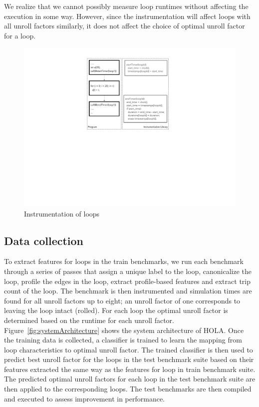 \documentclass[]{sig-alternate}
\begin{document}
We realize that we cannot possibly measure loop runtimes without affecting the execution in some way. However, since the instrumentation will affect loops with all unroll factors similarly, it does not affect the choice of optimal unroll factor for a loop. 

\begin{figure}
  \center
  \includegraphics[width=0.90\linewidth]{fig/instrumentation.pdf}
  \caption{Instrumentation of loops}
  \label{fig:instrumentation}
\end{figure}

\subsection{Data collection}
\label{subsec:DataCollection}

To extract features for loops in the train benchmarks, we run each benchmark through a series of passes that assign a unique label to the loop, canonicalize the loop, profile the edges in the loop, extract profile-based features and extract trip count of the loop. The benchmark is then instrumented and simulation times are found for all unroll factors up to eight; an unroll factor of one corresponds to leaving the loop intact (rolled). For each loop the optimal unroll factor is determined based on the runtime for each unroll factor. Figure~\ref{fig:systemArchitecture} shows the system architecture of HOLA. Once the training data is collected, a classifier is trained to learn the mapping from loop characteristics to optimal unroll factor. The trained classifier is then used to predict best unroll factor for the loops in the test benchmark suite based on their features extracted the same way as the features for loop in train benchmark suite. The predicted optimal unroll factors for each loop in the test benchmark suite are then applied to the corresponding loops. The test benchmarks are then compiled and executed to assess improvement in performance. 
\end{document}
